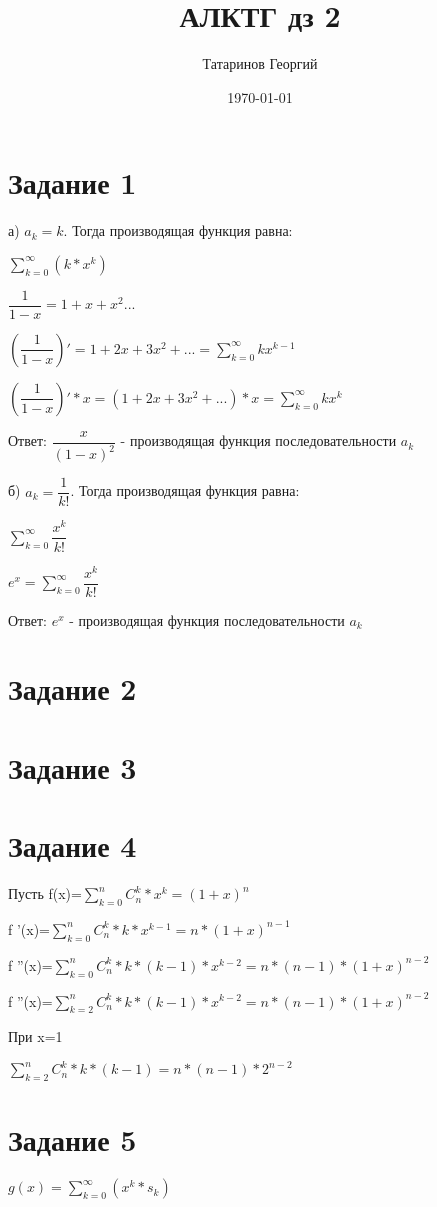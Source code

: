\documentclass[a4paper, 12pt]{article}
\title{АЛКТГ дз 2}
\author{Татаринов Георгий}
\date{\today}
\begin{document}
	\maketitle
	\section*{Задание 1}
		а) $a_k = k$. Тогда производящая функция равна:

		$\sum\limits_{k = 0}^{\infty} (k*x^k)$

		$\dfrac{1}{1 - x}=1 + x + x^2 ... $

		$(\dfrac{1}{1 - x})'= 1 + 2x + 3x^2 + ... = \sum\limits_{k = 0}^{\infty} kx^{k-1}$

		$(\dfrac{1}{1 - x})' * x = (1 + 2x + 3x^2 + ...) * x = \sum\limits_{k = 0}^{\infty} kx^k$

		Ответ: $\dfrac{x}{(1 - x)^2}$ - производящая функция последовательности $a_k$

		б) $a_k = \dfrac{1}{k!}$. Тогда производящая функция равна:

		$\sum\limits_{k = 0}^{\infty} \dfrac{x^k}{k!}$

		$e^x=\sum\limits_{k = 0}^{\infty} \dfrac{x^k}{k!}$

		Ответ: $e^x$ - производящая функция последовательности $a_k$
	\section*{Задание 2}
	\section*{Задание 3}
	\section*{Задание 4}
		Пусть f(x)=$\sum\limits_{k=0}^{n}C_n^k*x^k=(1+x)^n$

		f '(x)=$\sum\limits_{k=0}^{n}C_n^k*k*x^{k-1}=n*(1+x)^{n-1}$

		f ''(x)=$\sum\limits_{k=0}^{n}C_n^k*k*(k-1)*x^{k-2}=n*(n-1)*(1+x)^{n-2}$

		f ''(x)=$\sum\limits_{k=2}^{n}C_n^k*k*(k-1)*x^{k-2}=n*(n-1)*(1+x)^{n-2}$

		При x=1

		$\sum\limits_{k=2}^{n}C_n^k*k*(k-1)=n*(n-1)*2^{n-2}$
	\section*{Задание 5}
		$g(x)=\sum\limits_{k=0}^{\infty}(x^k*s_k)$
\end{document}
